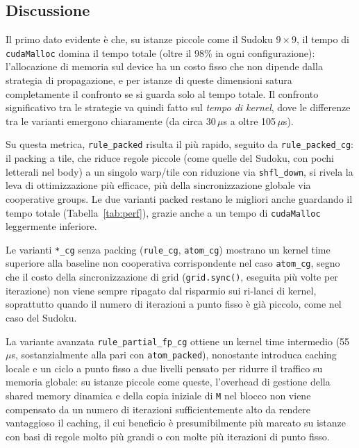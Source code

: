 \documentclass[11pt,a4paper]{article}
\begin{document}
\subsection{Discussione}

Il primo dato evidente è che, su istanze piccole come il Sudoku $9\times9$, il tempo di
\texttt{cudaMalloc} domina il tempo totale (oltre il 98\% in ogni configurazione): l'allocazione di
memoria sul device ha un costo fisso che non dipende dalla strategia di propagazione, e per istanze
di queste dimensioni satura completamente il confronto se si guarda solo al tempo totale. Il
confronto significativo tra le strategie va quindi fatto sul \emph{tempo di kernel}, dove le
differenze tra le varianti emergono chiaramente (da circa 30\,$\mu$s a oltre 105\,$\mu$s).

Su questa metrica, \texttt{rule\_packed} risulta il più rapido, seguito da \texttt{rule\_packed\_cg}:
il packing a tile, che riduce regole piccole (come quelle del Sudoku, con pochi letterali nel body)
a un singolo warp/tile con riduzione via \texttt{shfl\_down}, si rivela la leva di ottimizzazione più
efficace, più della sincronizzazione globale via cooperative groups. Le due varianti packed restano
le migliori anche guardando il tempo totale (Tabella~\ref{tab:perf}), grazie anche a un tempo di
\texttt{cudaMalloc} leggermente inferiore.

Le varianti \texttt{*\_cg} senza packing (\texttt{rule\_cg}, \texttt{atom\_cg}) mostrano un kernel
time superiore alla baseline non cooperativa corrispondente nel caso \texttt{atom\_cg}, segno che il
costo della sincronizzazione di grid (\texttt{grid.sync()}, eseguita più volte per iterazione) non
viene sempre ripagato dal risparmio sui ri-lanci di kernel, soprattutto quando il numero di
iterazioni a punto fisso è già piccolo, come nel caso del Sudoku.

La variante avanzata \texttt{rule\_partial\_fp\_cg} ottiene un kernel time intermedio
(55\,$\mu$s, sostanzialmente alla pari con \texttt{atom\_packed}), nonostante introduca caching
locale e un ciclo a punto fisso a due livelli pensato per ridurre il traffico su memoria globale: su
istanze piccole come queste, l'overhead di gestione della shared memory dinamica e della copia
iniziale di \texttt{M} nel blocco non viene compensato da un numero di iterazioni sufficientemente
alto da rendere vantaggioso il caching, il cui beneficio è presumibilmente più marcato su istanze
con basi di regole molto più grandi o con molte più iterazioni di punto fisso.
\end{document}
